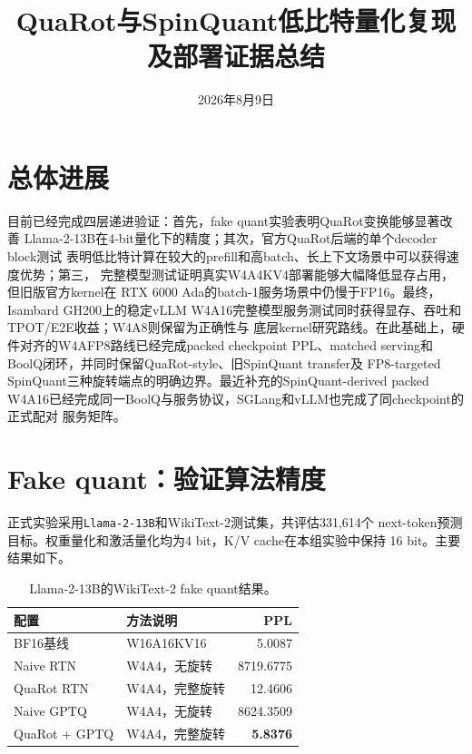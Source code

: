 \documentclass[11pt,a4paper]{ctexart}
\title{QuaRot与SpinQuant低比特量化复现及部署证据总结}
\author{}
\date{2026年8月9日}
\begin{document}
\maketitle
\vspace{-2.5em}

\section*{总体进展}

目前已经完成四层递进验证：首先，fake quant实验表明QuaRot变换能够显著改善
Llama-2-13B在4-bit量化下的精度；其次，官方QuaRot后端的单个decoder block测试
表明低比特计算在较大的prefill和高batch、长上下文场景中可以获得速度优势；第三，
完整模型测试证明真实W4A4KV4部署能够大幅降低显存占用，但旧版官方kernel在
RTX 6000 Ada的batch-1服务场景中仍慢于FP16。最终，Isambard GH200上的稳定vLLM
W4A16完整模型服务测试同时获得显存、吞吐和TPOT/E2E收益；W4A8则保留为正确性与
底层kernel研究路线。在此基础上，硬件对齐的W4AFP8路线已经完成packed checkpoint
PPL、matched serving和BoolQ闭环，并同时保留QuaRot-style、旧SpinQuant transfer及
FP8-targeted SpinQuant三种旋转端点的明确边界。最近补充的SpinQuant-derived packed
W4A16已经完成同一BoolQ与服务协议，SGLang和vLLM也完成了同checkpoint的正式配对
服务矩阵。

\section{Fake quant：验证算法精度}

正式实验采用\texttt{Llama-2-13B}和WikiText-2测试集，共评估331,614个
next-token预测目标。权重量化和激活量化均为4 bit，K/V cache在本组实验中保持
16 bit。主要结果如下。

\begin{table}[htbp]
  \centering
  \small
  \begin{tabular}{@{}llr@{}}
    \toprule
    配置 & 方法说明 & PPL \\
    \midrule
    BF16基线 & W16A16KV16 & 5.0087 \\
    Naive RTN & W4A4，无旋转 & 8719.6775 \\
    QuaRot RTN & W4A4，完整旋转 & 12.4606 \\
    Naive GPTQ & W4A4，无旋转 & 8624.3509 \\
    QuaRot + GPTQ & W4A4，完整旋转 & \textbf{5.8376} \\
    \bottomrule
  \end{tabular}
  \caption{Llama-2-13B的WikiText-2 fake quant结果。}
\end{table}
\end{document}
